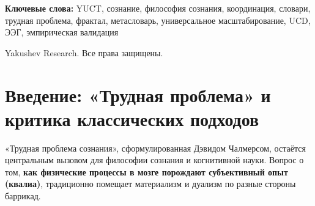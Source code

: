\documentclass[12pt,a4paper]{article}
\DeclareRobustCommand{\alD}{\texorpdfstring{\ensuremath{\alpha_{\mathrm{D}}}}{alpha_D}}
\DeclareRobustCommand{\beI}{\texorpdfstring{\ensuremath{\beta_{\mathrm{I}}}}{beta_I}}
\DeclareRobustCommand{\gaR}{\texorpdfstring{\ensuremath{\gamma_{\mathrm{R}}}}{gamma_R}}
\newcommand{\eff}{\mathrm{eff}}
\newcommand{\Ke}{K_{\eff}}
\begin{document}
\begin{titlepage}
\begin{center}
\begin{abstract}
				Ключевое значение имеет то, что эта философская рамка теперь опирается на универсальный эмпирический закон \(\varepsilon = \kappa_c \alpha \Ke^{-\beta}\) с \(\beta = 0.67\), подтверждённый более чем на 50 порядках величины (Приложение L) и независимо подтверждённый в шести научных областях: физика (гравитационные волны, GWTC-4.0), астрофизика (белые карлики, 26 041 объект), геофизика (система Земля–Луна), химия (873 энергии связей), биология (68 геномов позвоночных) и нейронаука (ЭЭГ-корреляты сознания, параметры UCD). В частности, Универсальный дескриптор сознания (UCD), введённый в Приложении H, предоставляет количественные меры \(\alD, \beI, \gaR\), которые коррелируют с состояниями сознания и следуют тому же закону масштабирования.
				
				Философские следствия включают: (1) натурализацию сознания без редукционизма; (2) новое понимание эволюции разума как роста сложности координационных словарей; (3) возможность неантропоморфных форм сознания (искусственного, коллективного, планетарного); (4) связь с тёмной материей/энергией как пределами космологической координации. YUCT предлагает не только решение «трудной проблемы», но и единую философскую платформу для диалога между нейронаукой, физикой и гуманитарными науками, теперь эмпирически обоснованную.
			\end{abstract}
			
			\vspace{0cm}
			
			\noindent
			\small\textbf{Ключевые слова:} YUCT, сознание, философия сознания, координация, словари, трудная проблема, фрактал, метасловарь, универсальное масштабирование, UCD, ЭЭГ, эмпирическая валидация
			
			\vspace{0.5cm}
			
			\noindent
			 Yakushev Research. Все права защищены.
		\end{center}
	\end{titlepage}
	
	\tableofcontents
	
	\newpage
	
	\section{Введение: «Трудная проблема» и критика классических подходов}
	
	«Трудная проблема сознания», сформулированная Дэвидом Чалмерсом, остаётся центральным вызовом для философии сознания и когнитивной науки. Вопрос о том, \textbf{как физические процессы в мозге порождают субъективный опыт (квалиа)}, традиционно помещает материализм и дуализм по разные стороны баррикад.
	
\end{document}
